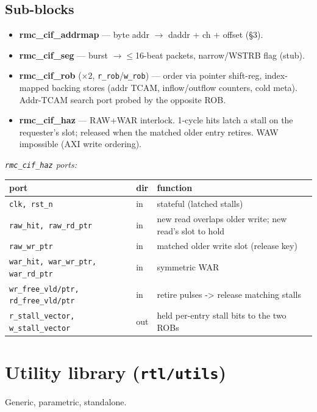 \documentclass[10pt]{article}
\newcommand{\sig}[1]{\texttt{\small #1}}
\newcommand{\blk}[1]{\textbf{#1}}
\begin{document}
\subsection{Sub-blocks}
\begin{itemize}\itemsep1pt
\item \blk{rmc\_cif\_addrmap} --- byte addr $\to$ daddr + ch + offset (\S3).
\item \blk{rmc\_cif\_seg} --- burst $\to \le$16-beat packets, narrow/WSTRB flag (stub).
\item \blk{rmc\_cif\_rob} ($\times$2, \sig{r\_rob}/\sig{w\_rob}) --- order via pointer shift-reg,
index-mapped backing stores (addr TCAM, inflow/outflow counters, cold meta). Addr-TCAM search
port probed by the opposite ROB.
\item \blk{rmc\_cif\_haz} --- RAW+WAR interlock. 1-cycle hits latch a stall on the requester's
slot; released when the matched older entry retires. WAW impossible (AXI write ordering).
\end{itemize}

\noindent\textit{\texttt{rmc\_cif\_haz} ports:}
\begin{longtable}{P{3.6cm} P{1.3cm} P{9.6cm}}
\toprule \blk{port} & \blk{dir} & \blk{function}\\ \midrule \endhead
\sig{clk, rst_n} & in & stateful (latched stalls)\\
\sig{raw_hit, raw_rd_ptr} & in & new read overlaps older write; new read's slot to hold\\
\sig{raw_wr_ptr} & in & matched older write slot (release key)\\
\sig{war_hit, war_wr_ptr, war_rd_ptr} & in & symmetric WAR\\
\sig{wr_free_vld/ptr, rd_free_vld/ptr} & in & retire pulses -> release matching stalls\\
\sig{r_stall_vector, w_stall_vector} & out & held per-entry stall bits to the two ROBs\\
\bottomrule
\end{longtable}

\section{Utility library (\texttt{rtl/utils})}
Generic, parametric, standalone.
\end{document}
